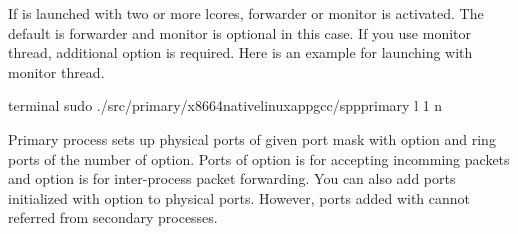 \documentclass[a4paper,11pt,openany,oneside,english]{sphinxmanual}
\begin{document}
If  is launched with two or more lcores, forwarder or monitor
is activated. The default is forwarder and monitor is optional in this case.
If you use monitor thread, additional option  is required.
Here is an example for launching  with monitor thread.

\begin{sphinxVerbatim}[commandchars=\\\{\},formatcom=\footnotesize]
 terminal 
 sudo ./src/primary/x86\PYGZus{}64\PYGZhy{}native\PYGZhy{}linuxapp\PYGZhy{}gcc/spp\PYGZus{}primary 
    \PYGZhy{}l \PYGZhy{}1 \PYGZhy{}n    
\end{sphinxVerbatim}

Primary process sets up physical ports of given port mask with  option
and ring ports of the number of  option. Ports of   option is for
accepting incomming packets and  option is for inter-process packet
forwarding. You can also add ports initialized with  option to
physical ports. However, ports added with  cannot referred from
secondary processes.
\end{document}
